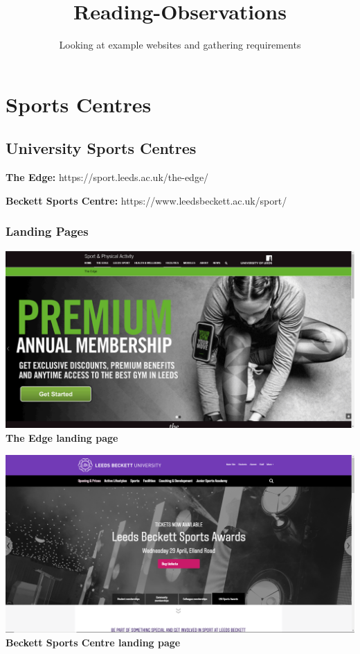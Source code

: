 \documentclass[12pt,a4paper]{article}
\begin{document}
\author{Looking at example websites and gathering requirements\vspace{-2ex}}
\date{\vspace{-5ex}}
\title{Reading-Observations\vspace{-2ex}}

\maketitle

\section{Sports Centres}
\subsection{University Sports Centres}

\begin{center}
	\textbf{The Edge:} https://sport.leeds.ac.uk/the-edge/

	\textbf{Beckett Sports Centre:} https://www.leedsbeckett.ac.uk/sport/
\end{center}

\subsubsection{Landing Pages}

\begin{center}
	\includegraphics[width=0.7\linewidth]{img/edge-sports-centre.png}\\
	 \textbf{The Edge landing page}
\end{center}

\begin{center}
	\includegraphics[width=0.7\linewidth]{img/beckett-sports-centre.png}\\
	\textbf{Beckett Sports Centre landing page}
\end{center}
\end{document}
